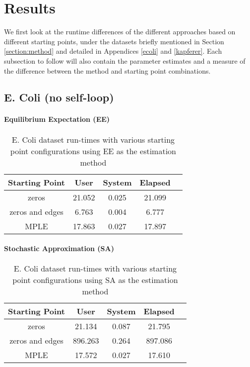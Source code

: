 \section{Results}
\label{section:results}

We first look at the runtime differences of the different approaches based on different starting points, under the datasets briefly mentioned in Section \ref{section:method} and detailed in Appendices \ref{ecoli} and \ref{kapferer}. Each subsection to follow will also contain the parameter estimates and a measure of the difference between the method and starting point combinations.

\subsection{E. Coli (no self-loop)}

\paragraph{Equilibrium Expectation (EE)}

\begin{table}[!ht]
 \centering
 \begin{tabular}{||c | c | c | c | c||} 
 \hline
 Starting Point & User & System & Elapsed \\
 \hline\hline
 zeros & 21.052 & 0.025 & 21.099 \\ 
 \hline
 zeros and edges & 6.763 & 0.004 & 6.777 \\
 \hline
 MPLE & 17.863 & 0.027 & 17.897 \\
 \hline
 \end{tabular}
 \label{t:ecoli1_ee}
 \caption{E. Coli dataset run-times with various starting point configurations using EE as the estimation method}
\end{table}

\paragraph{Stochastic Approximation (SA)}

\begin{table}[!ht]
\centering
\begin{tabular}{||c | c | c | c | c||}
 \hline
 Starting Point & User & System & Elapsed \\ 
 \hline
 zeros & 21.134 & 0.087 & 21.795 \\
 \hline
 zeros and edges & 896.263 & 0.264 & 897.086 \\ 
 \hline
 MPLE & 17.572 & 0.027 & 17.610 \\
 \hline
 \end{tabular}
 \label{t:ecoli1_sa}
 \caption{E. Coli dataset run-times with various starting point configurations using SA as the estimation method}
 \end{table}

